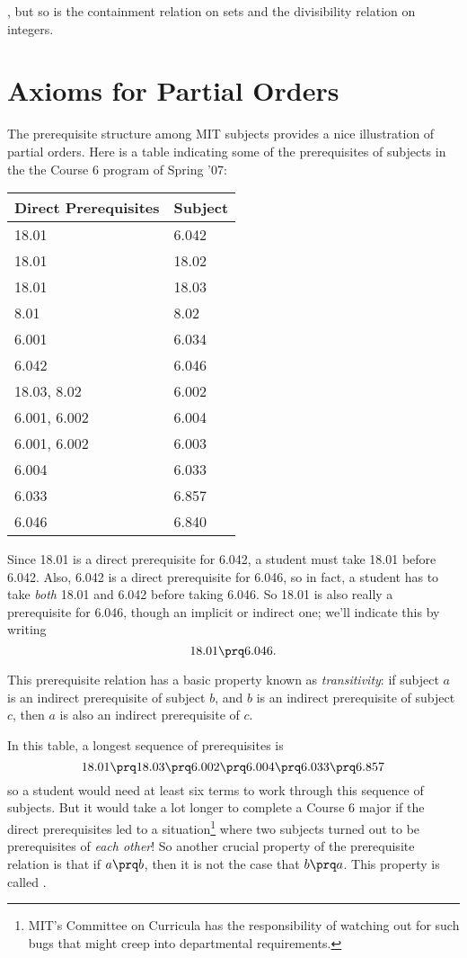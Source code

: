 , but so is the containment relation on sets
and the divisibility relation on integers.
\fi

\iffalse

\section{Axioms for Partial Orders}

The prerequisite structure among MIT subjects provides a nice illustration
of partial orders.  Here is a table indicating some of the prerequisites of
subjects in the the Course 6 program of Spring '07:
\begin{center}
\begin{tabular}{|l|l|}
\hline
Direct Prerequisites & Subject\\ \hline
18.01 & 6.042\\ \hline
 18.01 & 18.02\\ \hline
 18.01 & 18.03\\ \hline
 8.01 & 8.02\\ \hline
 6.001 & 6.034\\ \hline
 6.042 & 6.046\\ \hline
 18.03, 8.02 & 6.002\\ \hline
 6.001, 6.002 & 6.004\\ \hline
 6.001, 6.002 & 6.003\\ \hline
 6.004 & 6.033\\ \hline
 6.033 & 6.857\\ \hline
 6.046 & 6.840\\ \hline
\end{tabular}
\end{center}

Since 18.01 is a direct prerequisite for 6.042, a student must take 18.01
before 6.042.  Also, 6.042 is a direct prerequisite for 6.046, so in fact,
a student has to take \emph{both} 18.01 and 6.042 before taking 6.046.  So
18.01 is also really a prerequisite for 6.046, though an implicit or
indirect one; we'll indicate this by writing
\[
18.01 \prq 6.046.
\]

This prerequisite relation has a basic property known as
\emph{transitivity}: if subject $a$ is an indirect prerequisite of
subject $b$, and $b$ is an indirect prerequisite of subject $c$, then
$a$ is also an indirect prerequisite of $c$.

In this table, a longest sequence of prerequisites is
\[
18.01 \prq 18.03 \prq 6.002 \prq 6.004 \prq 6.033 \prq 6.857
\]
so a student would need at least six terms to work through this sequence
of subjects.  But it would take a lot longer to complete a Course 6 major
if the direct prerequisites led to a situation\footnote{MIT's Committee on
Curricula has the responsibility of watching out for such bugs that might
creep into departmental requirements.} where two subjects turned out to be
prerequisites of \emph{each other}!  So another crucial property of the
prerequisite relation is that if $a \prq b$, then it is not the case that
$b \prq a$.  This property is called .

